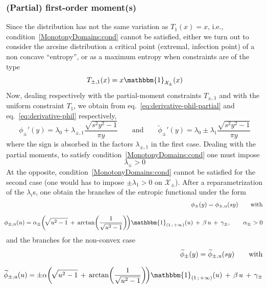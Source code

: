 \documentclass[entropy,article,submit,moreauthors,pdftex]{Definitions/mdpi}
\newcommand{\SZ}[1]{{\color{blue} #1}}                                       %
\def\X{\mathcal{X}}%
\def\un{\mathbbm{1}}%
\def\u{\mathrm{u}}
\begin{document}

\subsubsection{(Partial) first-order moment(s)}
\label{subsubsecapp:ArcsineFirstPartial}

\SZ{Since the  distribution has not  the same variation  as $T_1(x) =  x$, i.e.,
  condition~\ref{MonotonyDomains:cond} cannot  be satisfied, either we  turn out
  to consider  the arcsine  distribution a  critical point  (extremal, infection
  point) of a non concave ``entropy'',  or as a maximum entropy when constraints
  are of the type
%
\[
T_{\pm,1}(x) = x \un_{\X_\pm}(x)
\]
%
Now, dealing  respectively with  the partial-moment constraints  $T_{\pm,1}$ and
with     the      uniform     constraint      $T_1$,     we      obtain     from
eq.~\eqref{eq:derivative-phil-partial}     and    eq.~\eqref{eq:derivative-phil}
respectively,
%
\[
\phi_\pm'(y) =  \lambda_0 + \lambda_{\pm,1}  \frac{\sqrt{s^2  y^2 -
    1}}{\pi y} \qquad \mbox{and} \qquad \widetilde{\phi}_\pm'(y) = \lambda_0 \pm
\lambda_1 \frac{\sqrt{s^2 y^2 - 1}}{\pi y}
\]
%
where the sign  is absorbed in the factors $\lambda_{\pm,1}$  in the first case.
Dealing       with       the       partial       moments,       to       satisfy
condition~\ref{MonotonyDomains:cond} one must impose  $$\lambda_\pm > 0$$ At the
opposite,  condition~\ref{MonotonyDomains:cond}  cannot  be  satisfied  for  the
second case (one would  has to impose $\pm \lambda_1 > 0$  on $\X_\pm$). After a
reparametrization of the  $\lambda_i$s, one obtain the branches  of the entropic
functional under the form
%
\begin{eqnarray*}
  &&\hspace{-5mm}\phi_\pm(y) = \phi_{\pm,\u}(s y) \qquad \mbox{with}
  \\[2.5mm]
&&\hspace{-5mm}\phi_{\pm,\u}(u)  =  \alpha_\pm  \left(  \!  \sqrt{u^2  -  1}  \,  +  \,
\arctan\left( \frac{1}{\sqrt{u^2 - 1}} \right) \!  \right) \un_{\left( 1 \, ; \,
  +\infty \right)}(u) \,  + \, \beta \,  u \, + \,  \gamma_\pm, \qquad \alpha_\pm > 0
\end{eqnarray*}
%
and          the           branches
for the non-convex case
%
\begin{eqnarray*}
  &&\hspace{-5mm}\widetilde{\phi}_\pm(y) = \widetilde{\phi}_{\pm,\u}(s y) \qquad \mbox{with}
  \\[2.5mm]
  &&\hspace{-5mm}
  \widetilde{\phi}_{\pm,\u}(u) = \pm \alpha \left(  \! \sqrt{u^2 - 1} \, +
\, \arctan\left( \frac{1}{\sqrt{u^2 - 1}} \right)  \! \right) \un_{\left( 1 \, ;
  \, +\infty \right)}(u) \, + \, \beta \, u \, + \, \gamma_\pm
\end{eqnarray*}

}
\end{document}
